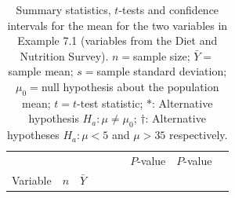 \documentclass[11pt,a4paper,openany]{book}
\begin{document}
\begin{longtable}[]{@{}lrrrrrrrc@{}}
\caption{\label{tab:t-ttests1} Summary statistics, \(t\)-tests and
confidence intervals for the mean for the two variables in Example 7.1
(variables from the Diet and Nutrition Survey). \(n=\)sample size;
\(\bar{Y}=\)sample mean; \(s=\)sample standard deviation;
\(\mu_{0}=\)null hypothesis about the population mean; \(t=t\)-test
statistic; \(*\): Alternative hypothesis \(H_{a}: \mu\ne \mu_{0}\);
\(\dagger\): Alternative hypotheses \(H_{a}: \mu<5\) and \(\mu>35\)
respectively.}\tabularnewline
\toprule
\begin{minipage}[t]{0.30\columnwidth}\raggedright\strut
\strut
\end{minipage} & \begin{minipage}[t]{0.04\columnwidth}\raggedleft\strut
\strut
\end{minipage} & \begin{minipage}[t]{0.05\columnwidth}\raggedleft\strut
\strut
\end{minipage} & \begin{minipage}[t]{0.03\columnwidth}\raggedleft\strut
\strut
\end{minipage} & \begin{minipage}[t]{0.05\columnwidth}\raggedleft\strut
\strut
\end{minipage} & \begin{minipage}[t]{0.03\columnwidth}\raggedleft\strut
\strut
\end{minipage} & \begin{minipage}[t]{0.13\columnwidth}\raggedleft\strut
\(P\)-value\strut
\end{minipage} & \begin{minipage}[t]{0.08\columnwidth}\raggedleft\strut
\(P\)-value\strut
\end{minipage} & \begin{minipage}[t]{0.06\columnwidth}\centering\strut
\strut
\end{minipage}\tabularnewline
\begin{minipage}[t]{0.30\columnwidth}\raggedright\strut
Variable\strut
\end{minipage} & \begin{minipage}[t]{0.04\columnwidth}\raggedleft\strut
\(n\)\strut
\end{minipage} & \begin{minipage}[t]{0.05\columnwidth}\raggedleft\strut
\(\bar{Y}\)\strut
\end{minipage} & \begin{minipage}[t]{0.03\columnwidth}\raggedleft\strut

\end{minipage}
\end{longtable}
\end{document}
